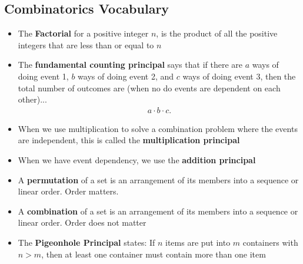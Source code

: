 \documentclass{report}
\begin{document}
      \subsection{\LARGE Combinatorics Vocabulary}
      \bigbreak \noindent 
      \begin{itemize}
        \item The \textbf{Factorial} for a positive integer $n$, is the product of all the positive integers that are less than or equal to $n$ 
        \item The \textbf{fundamental counting principal} says that if there are $a$ ways of doing event 1, $b$ ways of doing event 2, and $c$ ways of doing event 3, then the total number of outcomes are (when no do events are dependent on each other)...
        \begin{align*}
            a \cdot b \cdot c
        .\end{align*}
      \item When we use multiplication to solve a combination problem where the events are independent, this is called the \textbf{multiplication principal}
      \item When we have event dependency, we use the \textbf{addition principal} 
      \item A \textbf{permutation} of a set is an arrangement of its members into a sequence or linear order. Order matters.
      \item A \textbf{combination} of a set is an arrangement of its members into  a sequence or linear order. Order does not matter
      \item The \textbf{Pigeonhole Principal} states: If $n$ items are put into $m$ containers with $ n>m $, then at least one container must contain more than one item 
      \end{itemize}



      \pagebreak \bigbreak \noindent 
\end{document}
